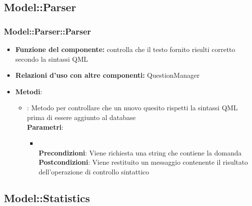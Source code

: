 \subsection{Model::Parser}
\subsubsection{Model::Parser::Parser}
\begin{itemize}
\item\textbf{Funzione del componente:} controlla che il testo fornito risulti corretto secondo la sintassi QML
\item\textbf{Relazioni d'uso con altre componenti:} QuestionManager\\
\item\textbf{Metodi}:
	\begin{itemize}
		\item{} : Metodo per controllare che un nuovo quesito rispetti la sintassi QML prima di essere aggiunto al database\\
		\textbf{Parametri}:
			\begin{itemize}
				\item{}\\
				\textbf{Precondizioni}: Viene richiesta una string che contiene la domanda\\
				\textbf{Postcondizioni}: Viene restituito un messaggio contenente il risultato dell'operazione di controllo sintattico\\
			\end{itemize}
	\end{itemize}
\end{itemize}

\subsection{Model::Statistics}
